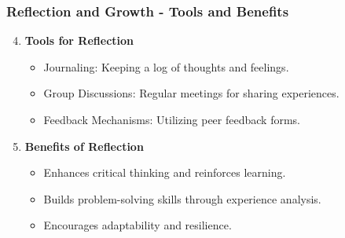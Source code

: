 \documentclass[aspectratio=169]{beamer}
\begin{document}
\begin{frame}[fragile]
    \frametitle{Reflection and Growth - Tools and Benefits}
    
    \begin{enumerate}
        \setcounter{enumi}{3}
        
        \item \textbf{Tools for Reflection}
            \begin{itemize}
                \item Journaling: Keeping a log of thoughts and feelings.
                \item Group Discussions: Regular meetings for sharing experiences.
                \item Feedback Mechanisms: Utilizing peer feedback forms.
            \end{itemize}
        
        \item \textbf{Benefits of Reflection}
            \begin{itemize}
                \item Enhances critical thinking and reinforces learning.
                \item Builds problem-solving skills through experience analysis.
                \item Encourages adaptability and resilience.
            \end{itemize}
    \end{enumerate}
\end{frame}
\end{document}
